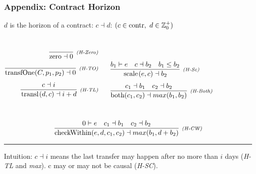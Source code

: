 \documentclass[xcolor=dvipsnames,11pt]{beamer}
\renewcommand{\emph}[1]{\textcolor{structure!90}{#1}}
\newcommand{\ttt}[1]{\mbox{\cd{#1}}}
\newcommand{\zero}{\ttt{zero}}
\newcommand{\transfOne}{\ttt{transfOne}}
\newcommand{\scale}{\ttt{scale}}
\newcommand{\transl}{\ttt{transl}}
\newcommand{\both}{\ttt{both}}
\newcommand{\checkWithin}{\ttt{checkWithin}}
\begin{document}
\begin{frame}[fragile,t]
    \frametitle{Appendix: Contract Horizon}

\emph{$d$ is the horizon} of a contract: $ c \dashv d$:
{\scriptsize $ (c \in \ttt{contr},\ d \in \mathbb{Z}_0^+) $}

\begin{columns}
\begin{align*}
\crule{(H-Zero)}{}{\zero \dashv 0}&\\[1ex]
\crule{(H-TO)}{}{\transfOne(C,p_1,p_2)\dashv 0}&\\[1ex]
\crule{(H-TL)}{c \dashv i }{\transl(d,c) \dashv i + d }&\\[1ex]
\end{align*}

\begin{align*}
&\\[1ex]
&\crule{(H-Sc)}{b_1 \vdash e\ \ \ c \dashv b_2\ \ \ b_1 \leq b_2 }{\scale(e,c) \dashv b_2 }\\[1ex]
&\crule{(H-Both)}{c_1 \dashv b_1 \ \ \ c_2 \dashv b_2 }{\both(c_1,c_2) \dashv max(b_1,b_2) }\\[1ex]
\end{align*}
\end{columns}
$$ 
\crule{(H-CW)}{0\vdash e\ \ \ c_1 \dashv b_1 \ \ \ c_2 \dashv b_2 }{\checkWithin(e,d,c_1,c_2) \dashv max(b_1,d+b_2) }
$$

\medskip
\hrule
\medskip

\emph{Intuition:} $c \dashv i$ means the last transfer may happen after no more than $i$ days (\textit{H-TL} and \textit{max}). c may or may not be causal (\textit{H-SC}).

\end{frame}
\end{document}
